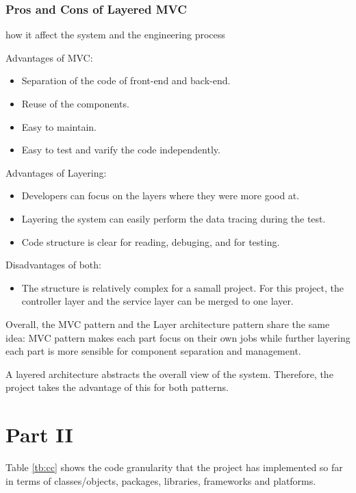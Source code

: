 \documentclass[conference]{IEEEtran}
\begin{document}
\subsubsection{\textbf{Pros and Cons of Layered MVC}} how it affect the system and the engineering process

Advantages of MVC:
\begin{itemize}
	\item Separation of the code of front-end and back-end.
	\item Reuse of the components.
	\item Easy to maintain.
	\item Easy to test and varify the code independently.
\end{itemize}

Advantages of Layering:

\begin{itemize}
	\item Developers can focus on the layers where they were more good at.
	\item Layering the system can easily perform the data tracing during the test.
	\item Code structure is clear for reading, debuging, and for testing.
\end{itemize}

Disadvantages of both:
\begin{itemize}
	\item The structure is relatively complex for a samall project.
	      For this project, the controller layer and the service layer can be merged to one layer.
\end{itemize}

Overall, the MVC pattern and the Layer architecture pattern share the same idea:
MVC pattern makes each part focus on their own jobs while further layering each part is more sensible for component separation and management.

A layered architecture abstracts the overall view of the system.
Therefore, the project takes the advantage of this for both patterns.

\section{Part II}

Table \ref{tb:cc} shows the code granularity that the project has implemented so far in terms of classes/objects, packages,
libraries, frameworks and platforms.
\end{document}
